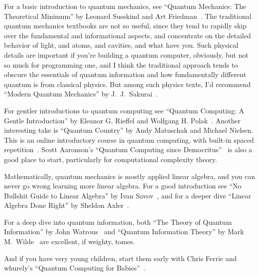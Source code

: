 For a basic introduction to quantum mechanics, see ``Quantum Mechanics: The Theoretical Minimum''
by Leonard Susskind and Art Friedman~\cite{Susskind2015a}. The traditional quantum mechanics textbooks are not so useful, since they tend to rapidly skip over the fundamental and informational aspects, and concentrate on the detailed behavior of light, and atoms, and cavities, and what have you. Such physical details  are important if you're building a quantum computer, obviously, but not so much for programming one, and I think the traditional approach tends to obscure the essentials of quantum information and how fundamentally different quantum is from classical physics. But among such physics texts, I'd recommend ``Modern Quantum Mechanics'' by J.~J.~Sakurai~\cite{Sakurai2010a}.

For gentler introductions to quantum computing see ``Quantum Computing: A Gentle Introduction'' by Eleanor G. Rieffel and Wolfgang H. Polak~\cite{Rieffel2014a}. 
Another interesting take is ``Quantum Country'' by Andy Matuschak and Michael Nielsen. This is an online introductory course in quantum computing, with built-in spaced repetition~\cite{Matuschak2019a}. Scott Aaronson's ``Quantum Computing since Democritus''~\cite{Aaronson2013a} is also a good place to start, particularly for computational complexity theory.

%     


Mathematically, quantum mechanics is mostly applied linear algebra, and you can never go wrong learning more linear algebra. For a good introduction see ``No Bullshit Guide to Linear Algebra'' by Ivan Savov~\cite{Savov2017a}, and for a deeper dive ``Linear Algebra Done Right'' by Sheldon Axler~\cite{Axler2015a}.


For a deep dive into quantum information, both ``The Theory of Quantum Information'' by John Watrous~\cite{Watrous2018a} and ``Quantum Information Theory'' by Mark M.~Wilde~\cite{Wilde2017a} are excellent, if weighty, tomes.

And if you have very young children, start them early with Chris Ferrie and whurely's ``Quantum Computing for Babies''~\cite{Ferrie2018a}.

